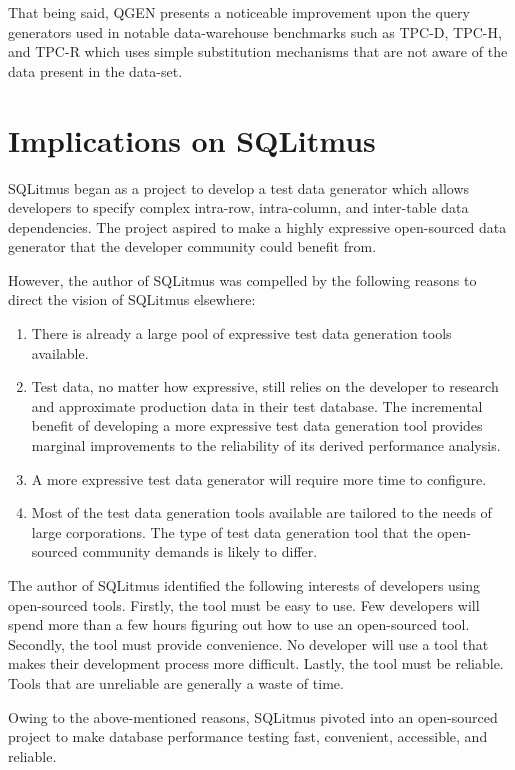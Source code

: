 \documentclass[12pt]{report}
\begin{document}
\begin{spacing}{1.9}
		
		That being said, QGEN presents a noticeable improvement upon the query generators used in notable data-warehouse benchmarks such as TPC-D, TPC-H, and TPC-R which uses simple substitution mechanisms that are not aware of the data present in the data-set.
		
		\section{Implications on SQLitmus}
		SQLitmus began as a project to develop a test data generator which allows developers to specify complex intra-row, intra-column, and inter-table data dependencies. The project aspired to make a highly expressive open-sourced data generator that the developer community could benefit from.
		
		However, the author of SQLitmus was compelled by the following reasons to direct the vision of SQLitmus elsewhere:
		\begin{enumerate}
			\item There is already a large pool of expressive test data generation tools available.
			\item Test data, no matter how expressive, still relies on the developer to research and approximate production data in their test database. The incremental benefit of developing a more expressive test data generation tool provides marginal improvements to the reliability of its derived performance analysis.
			\item A more expressive test data generator will require more time to configure. 
			\item Most of the test data generation tools available are tailored to the needs of large corporations. The type of test data generation tool that the open-sourced community demands is likely to differ. 
		\end{enumerate}
		
		The author of SQLitmus identified the following interests of developers using open-sourced tools. Firstly, the tool must be easy to use. Few developers will spend more than a few hours figuring out how to use an open-sourced tool. Secondly, the tool must provide convenience. No developer will use a tool that makes their development process more difficult. Lastly, the tool must be reliable. Tools that are unreliable are generally a waste of time.
		
		Owing to the above-mentioned reasons, SQLitmus pivoted into an open-sourced project to make database performance testing fast, convenient, accessible, and reliable.
		

\end{spacing}
\end{document}
